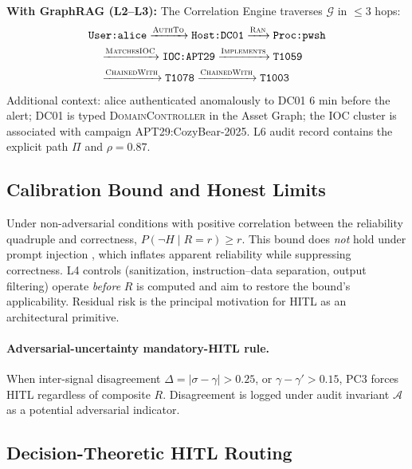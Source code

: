 \documentclass[journal]{IEEEtran}
\begin{document}
\noindent\textbf{With GraphRAG (L2--L3):} The Correlation Engine traverses $\mathcal{G}$
in $\leq 3$ hops:
\begin{align*}
&\texttt{User:alice} \xrightarrow{\textsc{AuthTo}} \texttt{Host:DC01} \xrightarrow{\textsc{Ran}}
\texttt{Proc:pwsh} \\
&\quad\xrightarrow{\textsc{MatchesIOC}} \texttt{IOC:APT29}
\xrightarrow{\textsc{Implements}} \texttt{T1059} \\
&\quad\xrightarrow{\textsc{ChainedWith}} \texttt{T1078}
\xrightarrow{\textsc{ChainedWith}} \texttt{T1003}
\end{align*}
Additional context: alice authenticated anomalously to DC01 6 min before the alert; DC01
is typed \textsc{DomainController} in the Asset Graph; the IOC cluster is associated with
campaign APT29:CozyBear-2025. L6 audit record contains the explicit path $\Pi$ and
$\rho = 0.87$.

\subsection{Calibration Bound and Honest Limits}
Under non-adversarial conditions with positive correlation between the reliability quadruple
and correctness, $P(\neg H \mid R = r) \geq r$. This bound does \emph{not} hold under prompt
injection \cite{liu2024formalizing,zou2023universal}, which inflates apparent reliability
while suppressing correctness. L4 controls (sanitization, instruction--data separation,
output filtering) operate \emph{before} $R$ is computed and aim to restore the bound's
applicability. Residual risk is the principal motivation for HITL as an architectural primitive.

\paragraph{Adversarial-uncertainty mandatory-HITL rule.}
When inter-signal disagreement $\Delta = |\sigma - \gamma| > 0.25$, or
$\gamma - \gamma' > 0.15$, PC3 forces HITL regardless of composite $R$.
Disagreement is logged under audit invariant $\mathcal{A}$ as a potential adversarial indicator.

\subsection{Decision-Theoretic HITL Routing}
\label{ssec:hitl}
\end{document}
